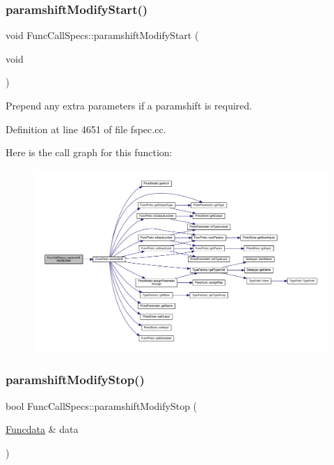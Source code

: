 \subsubsection{\texorpdfstring{paramshiftModifyStart()}{paramshiftModifyStart()}}
{\footnotesize\ttfamily void Func\+Call\+Specs\+::paramshift\+Modify\+Start (\begin{DoxyParamCaption}\item[{void}]{ }\end{DoxyParamCaption})}



Prepend any extra parameters if a paramshift is required. 



Definition at line 4651 of file fspec.\+cc.

Here is the call graph for this function\+:
\nopagebreak
\begin{figure}[H]
\begin{center}
\leavevmode
\includegraphics[width=350pt]{class_func_call_specs_aac7bcd5ea5ed14adbe74b4ca4c7e0814_cgraph}
\end{center}
\end{figure}
\mbox{\label{class_func_call_specs_a01e16ebebb71bdc63fb884c8d0e3b7e3}} 
\subsubsection{\texorpdfstring{paramshiftModifyStop()}{paramshiftModifyStop()}}
{\footnotesize\ttfamily bool Func\+Call\+Specs\+::paramshift\+Modify\+Stop (\begin{DoxyParamCaption}\item[{\mbox{\hyperlink{class_funcdata}{Funcdata}} \&}]{data }\end{DoxyParamCaption})}



